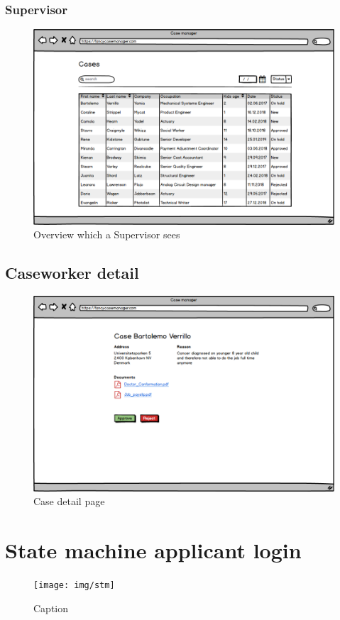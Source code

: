 \newpage
\subsubsection{Supervisor}
\begin{figure}[htb!]
    \centering
    \includegraphics[width=\textwidth]{img/page-supervisor-overview.png}
    \caption{Overview which a Supervisor sees}
\end{figure}

\newpage
\subsection{Caseworker detail}
\begin{figure}[htb!]
    \centering
    \includegraphics[width=\textwidth]{img/page-case-detail.png}
    \caption{Case detail page}
\end{figure}

\section{State machine applicant login}

\begin{figure}
    \centering
    \texttt{[image: img/stm]}
    \caption{Caption}
    \label{fig:my_label}
\end{figure}